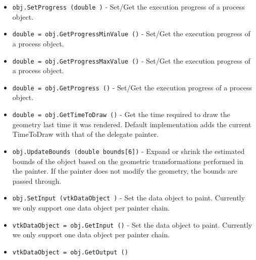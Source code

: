 \begin{itemize}
\item  \verb|obj.SetProgress (double )| -  Set/Get the execution progress of a process object.

\item  \verb|double = obj.GetProgressMinValue ()| -  Set/Get the execution progress of a process object.

\item  \verb|double = obj.GetProgressMaxValue ()| -  Set/Get the execution progress of a process object.

\item  \verb|double = obj.GetProgress ()| -  Set/Get the execution progress of a process object.

\item  \verb|double = obj.GetTimeToDraw ()| -  Get the time required to draw the geometry last time it was rendered.
 Default implementation adds the current TimeToDraw with that of the
 delegate painter.

\item  \verb|obj.UpdateBounds (double bounds[6])| -  Expand or shrink the estimated bounds of the object based on the
 geometric transformations performed in the painter. If the painter
 does not modify the geometry, the bounds are passed through.

\item  \verb|obj.SetInput (vtkDataObject )| -  Set the data object to paint. Currently we only support one data object per
 painter chain.

\item  \verb|vtkDataObject = obj.GetInput ()| -  Set the data object to paint. Currently we only support one data object per
 painter chain.

\item  \verb|vtkDataObject = obj.GetOutput ()|

\end{itemize}

